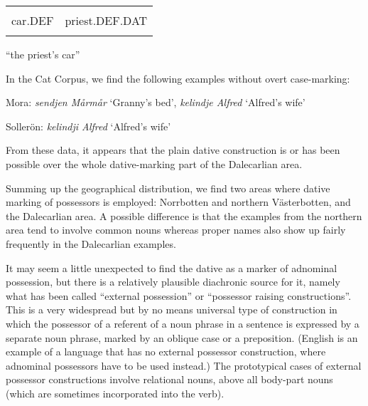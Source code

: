 \begin{tabular}{ll}
\lsptoprule
\multicolumn{2}{l}{biln

}\\
car.DEF & priest.DEF.DAT\\
\lspbottomrule
\end{tabular}

\begin{styleTranslation}
“the priest’s car”

\end{styleTranslation}

In the Cat Corpus, we find the following examples without overt case-marking:

\begin{listWWNumileveli}
\item {}

\end{listWWNumileveli}

\begin{styleListiii}
Mora: \textit{sendjen Mårmår} ‘Granny’s bed’, \textit{kelindje Alfred }‘Alfred’s wife’

\end{styleListiii}

\begin{styleListiii}
Sollerön: \textit{kelindji Alfred} ‘Alfred’s wife’

\end{styleListiii}

\begin{styleBodyTextFirst}
From these data, it appears that the plain dative construction is or has been possible over the whole dative-marking part of the Dalecarlian area. 

\end{styleBodyTextFirst}

\begin{styleBodytextC}
Summing up the geographical distribution, we find two areas where dative marking of possessors is employed: Norrbotten and northern Västerbotten, and the Dalecarlian area. A possible difference is that the examples from the northern area tend to involve common nouns whereas proper names also show up fairly frequently in the Dalecarlian examples. 

\end{styleBodytextC}

\begin{styleBodytextC}
It may seem a little unexpected to find the dative as a marker of adnominal possession, but there is a relatively plausible diachronic source for it, namely what has been called “external possession” or “possessor raising constructions”. This is a very widespread but by no means universal type of construction in which the possessor of a referent of a noun phrase in a sentence is expressed by a separate noun phrase, marked by an oblique case or a preposition. (English is an example of a language that has no external possessor construction, where adnominal possessors have to be used instead.) The prototypical cases of external possessor constructions involve relational nouns, above all body-part nouns (which are sometimes incorporated into the verb).

\end{styleBodytextC}

